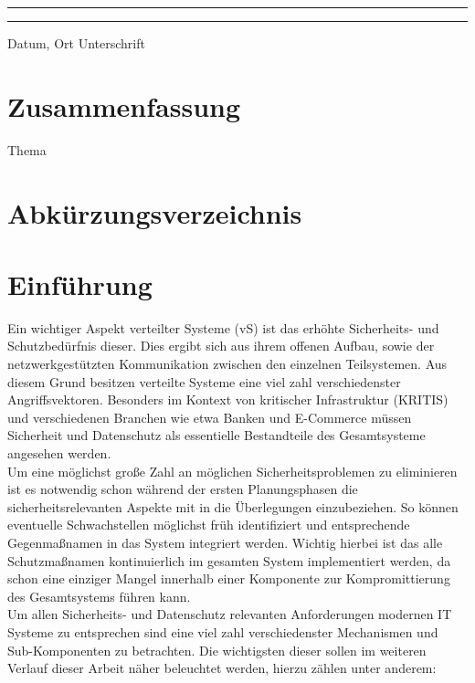 \documentclass[12pt,a4paper,parskip=half]{scrreprt}
\begin{document}
\vfill
\noindent\rule{5cm}{.4pt}\hfill\rule{5cm}{.4pt}\par
\noindent Datum, Ort \hfill Unterschrift 

\newpage
\thispagestyle{empty}
\chapter*{Zusammenfassung}

Thema
\\
\bigskip

\tableofcontents
{}

\listoffigures
{} 

\newpage
\chapter*{Abkürzungsverzeichnis}
\begin{acronym}[HTTP]
\end{acronym}


\chapter{Einführung}

Ein wichtiger Aspekt verteilter Systeme (vS) ist das erhöhte Sicherheits- und Schutzbedürfnis dieser. Dies ergibt sich aus ihrem offenen Aufbau, sowie der netzwerkgestützten Kommunikation zwischen den einzelnen Teilsystemen. Aus diesem Grund besitzen verteilte Systeme eine viel zahl verschiedenster Angriffsvektoren. Besonders im Kontext von kritischer Infrastruktur (KRITIS) und verschiedenen Branchen wie etwa Banken und E-Commerce müssen Sicherheit und Datenschutz als essentielle Bestandteile des Gesamtsysteme angesehen werden.
\\
Um eine möglichst große Zahl an möglichen Sicherheitsproblemen zu eliminieren ist es notwendig schon während der ersten Planungsphasen die sicherheitsrelevanten Aspekte mit in die Überlegungen einzubeziehen. So können eventuelle Schwachstellen möglichst früh identifiziert und entsprechende Gegenmaßnamen in das System integriert werden. Wichtig hierbei ist das alle Schutzmaßnamen kontinuierlich im gesamten System implementiert werden, da schon eine einziger Mangel innerhalb einer Komponente zur Kompromittierung des Gesamtsystems führen kann.
\\
Um allen Sicherheits- und Datenschutz relevanten Anforderungen modernen IT Systeme zu entsprechen sind eine viel zahl verschiedenster Mechanismen und Sub-Komponenten zu betrachten. Die wichtigsten dieser sollen im weiteren Verlauf dieser Arbeit näher beleuchtet werden, hierzu zählen unter anderem:
\end{document}
